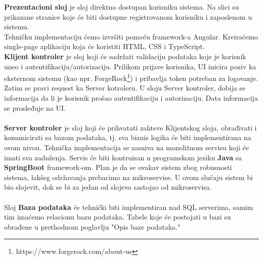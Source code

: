 \documentclass[../main.tex]{subfiles}
\begin{document}
\textbf{Prezentacioni sloj} je sloj direktno dostupan korisniku sistema. Na slici su prikazane stranice koje će biti dostupne registrovanom korisniku i zaposlenom u sistemu. \\
Tehničku implementaciju ćemo izvršiti pomoću framework-a Angular. Kreiraćemo single-page aplikaciju koja će koristiti HTML, CSS i TypeScript. \\
\textbf{Klijent kontroler} je sloj koji će sadržati validaciju podataka koje je korisnik uneo i autentifikaciju/autorizaciju. 
Prilikom prijave korisnika, UI inicira poziv ka eksternom sistemu (kao npr. ForgeRock\footnote{https://www.forgerock.com/about-us}) i pribavlja token potreban za logovanje. Zatim se pravi request ka Server kotroleru. U sloju Server kontroler, dobija se informacija da li je korisnik prošao autentifikaciju i autorizaciju. Data informacija se prosleđuje na UI. \\ \\
\textbf{Server kontroler} je sloj koji će prihvatati zahteve Klijentskog sloja, obrađivati i komunicirati sa bazom podataka, tj. sva biznis logika će biti implementirana na ovom nivou.
Tehnička implementacija se zasniva na monolitnom servisu koji će imati sva zaduženja. Servis će biti kontruisan u programskom jeziku \textbf{Java} sa \textbf{SpringBoot} framework-om. 
Plan je da se ovakav sistem zbog robusnosti sistema, lakšeg održavanja prebacimo na mikroservise. U ovom slučaju sistem bi bio slojevit, dok se bi za jedan od slojeva sastojao od mikroservisa.
\\ \\
Sloj \textbf{Baza podataka} će tehnički biti implementiran nad SQL serverima, samim tim imaćemo relacionu bazu podataka. Tabele koje će postojati u bazi su obrađene u prethodnom poglavlju "Opis baze podataka."
\end{document}
